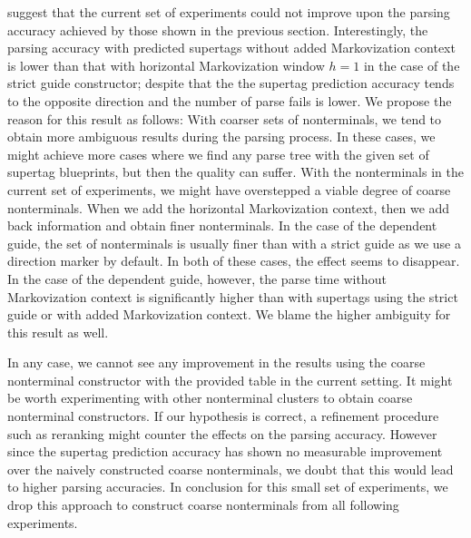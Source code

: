 \documentclass[../../document.tex]{subfiles}
\begin{document}
     suggest that the current set of experiments could not improve upon the parsing accuracy achieved by those shown in the previous section.
    Interestingly, the parsing accuracy with predicted supertags without added Markovization context is lower than that with horizontal Markovization window \(h=1\) in the case of the strict guide constructor; despite that the the supertag prediction accuracy tends to the opposite direction and the number of parse fails is lower.
    We propose the reason for this result as follows:
        With coarser sets of nonterminals, we tend to obtain more ambiguous results during the parsing process.
        In these cases, we might achieve more cases where we find any parse tree with the given set of supertag blueprints, but then the quality can suffer.
        With the nonterminals in the current set of experiments, we might have overstepped a viable degree of coarse nonterminals.
        When we add the horizontal Markovization context, then we add back information and obtain finer nonterminals.
        In the case of the dependent guide, the set of nonterminals is usually finer than with a strict guide as we use a direction marker by default.
        In both of these cases, the effect seems to disappear.
    In the case of the dependent guide, however, the parse time without Markovization context is significantly higher than with supertags using the strict guide or with added Markovization context.
    We blame the higher ambiguity for this result as well.

    In any case, we cannot see any improvement in the results using the coarse nonterminal constructor with the provided table in the current setting.
    It might be worth experimenting with other nonterminal clusters to obtain coarse nonterminal constructors.
    If our hypothesis is correct, a refinement procedure such as reranking might counter the effects on the parsing accuracy.
    However since the supertag prediction accuracy has shown no measurable improvement over the naively constructed coarse nonterminals, we doubt that this would lead to higher parsing accuracies.
    In conclusion for this small set of experiments, we drop this approach to construct coarse nonterminals from all following experiments. 
    
\end{document}
